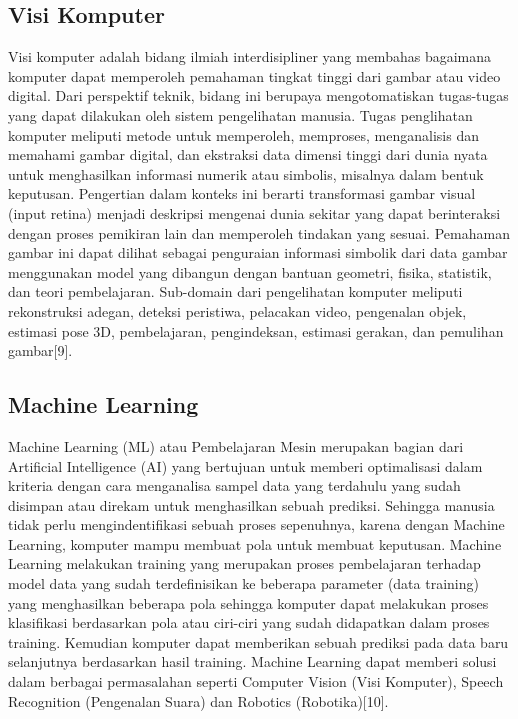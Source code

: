 \subsection{Visi Komputer}
Visi komputer adalah bidang ilmiah interdisipliner yang membahas bagaimana komputer dapat memperoleh 
pemahaman tingkat tinggi dari gambar atau video digital. Dari perspektif teknik, bidang ini berupaya 
mengotomatiskan tugas-tugas yang dapat dilakukan oleh sistem pengelihatan  manusia. Tugas  penglihatan 
komputer   meliputi metode untuk memperoleh, memproses, menganalisis dan memahami gambar digital, dan 
ekstraksi data dimensi tinggi dari dunia nyata untuk menghasilkan informasi numerik atau simbolis, 
misalnya dalam bentuk keputusan. Pengertian dalam konteks ini berarti transformasi gambar visual 
(input retina) menjadi deskripsi mengenai dunia sekitar yang dapat berinteraksi dengan proses pemikiran 
lain dan memperoleh tindakan yang sesuai. Pemahaman gambar ini dapat dilihat sebagai penguraian informasi 
simbolik dari data gambar menggunakan model yang dibangun dengan bantuan geometri, fisika, statistik, dan 
teori pembelajaran. Sub-domain dari pengelihatan komputer meliputi rekonstruksi adegan, deteksi peristiwa, 
pelacakan video, pengenalan objek, estimasi pose 3D, pembelajaran, pengindeksan, estimasi gerakan, dan 
pemulihan gambar[9].

\subsection{Machine Learning}
Machine Learning (ML) atau Pembelajaran Mesin merupakan bagian dari Artificial Intelligence (AI) yang 
bertujuan untuk memberi optimalisasi dalam kriteria dengan cara menganalisa sampel data yang terdahulu 
yang sudah disimpan atau direkam untuk menghasilkan sebuah prediksi. Sehingga manusia tidak perlu 
mengindentifikasi sebuah proses sepenuhnya, karena dengan Machine Learning, komputer mampu membuat pola 
untuk membuat keputusan. Machine Learning melakukan training yang merupakan proses pembelajaran terhadap 
model data yang sudah terdefinisikan ke beberapa parameter (data training) yang menghasilkan beberapa 
pola sehingga komputer dapat melakukan proses klasifikasi berdasarkan pola atau ciri-ciri yang sudah 
didapatkan dalam proses training. Kemudian komputer dapat memberikan sebuah prediksi pada data baru 
selanjutnya berdasarkan hasil training. Machine Learning dapat memberi solusi dalam berbagai permasalahan
 seperti Computer Vision (Visi Komputer), Speech Recognition (Pengenalan Suara) dan Robotics (Robotika)[10].

